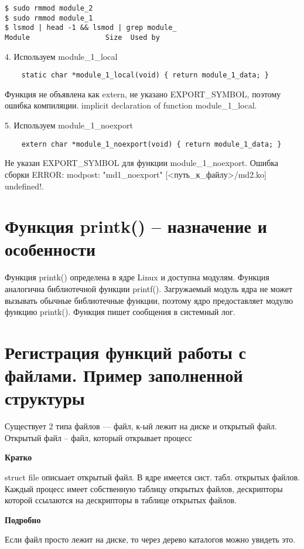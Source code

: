 \begin{lstlisting}
$ sudo rmmod module_2
$ sudo rmmod module_1
$ lsmod | head -1 && lsmod | grep module_
Module                  Size  Used by
\end{lstlisting}

4. Используем module\_1\_local
\begin{lstlisting}
	static char *module_1_local(void) { return module_1_data; }
\end{lstlisting}

Функция не объявлена как extern, не указано EXPORT\_SYMBOL, поэтому ошибка компиляции. implicit declaration of function module\_1\_local.

5. Используем module\_1\_noexport
\begin{lstlisting}
	extern char *module_1_noexport(void) { return module_1_data; }
\end{lstlisting}

Не указан EXPORT\_SYMBOL для функции module\_1\_noexport. Ошибка сборки ERROR: modpost: "md1\_noexport" [<путь\_к\_файлу>/md2.ko] undefined!.

\section{Функция printk() – назначение и особенности}
Функция printk() определена в ядре Linux и доступна модулям. Функция аналогична библиотечной функции printf(). Загружаемый модуль ядра не может вызывать обычные библиотечные функции, поэтому ядро предоставляет модулю функцию printk(). Функция пишет сообщения в системный лог.

\section{Регистрация функций работы с файлами. Пример заполненной структуры}

Существует 2 типа файлов --- файл, к-ый лежит на диске и открытый файл. Открытый файл -- файл, который открывает процесс

\textbf{Кратко}

struct file описыает открытый файл. В ядре имеется сист. табл. открытых файлов. Каждый процесс имеет собственную таблицу открытых файлов, дескрипторы которой ссылаются на дескрипторы в таблице открытых файлов.

\textbf{Подробно}

Если файл просто лежит на диске, то через дерево каталогов можно увидеть это. 

